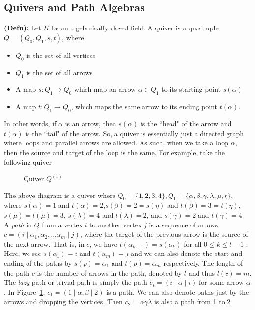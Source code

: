 \documentclass{report}
\theoremstyle{definition}
\numberwithin{figure}{section}
\begin{document}
\subsection{Quivers and Path Algebras}
\textbf{(Defn): }Let $K$ be an algebraically closed field. A quiver is a quadruple $Q=(Q_0,Q_1,s,t)$, where \begin{itemize}
    \item $Q_0$ is the set of all vertices 
    \item $Q_1$ is the set of all arrows
    \item A map $s:Q_1 \to Q_0$ which map an arrow $\alpha \in Q_1$ to its starting point $s(\alpha)$ 
    \item A map $t:Q_1 \to Q_0$, which maps the same arrow to its ending point $t(\alpha)$. 
\end{itemize}
In other words, if $\alpha$ is an arrow, then $s(\alpha)$ is the ``head" of the arrow and $t(\alpha)$ is the ``tail" of the arrow. So, a quiver is essentially just a directed graph where loops and parallel arrows are allowed. As such, when we take a loop $\alpha$, then the source and target of the loop is the same. For example, take the following quiver
\begin{figure}[H]
\centering
{}
\caption{Quiver $Q^{(1)}$}
\label{fig:quiverexample}
\end{figure}

 The above diagram is a quiver where $Q_0=\{1,2,3,4\},Q_1=\{\alpha,\beta,\gamma,\lambda,\mu,\eta\}$. where $s(\alpha)=1$ and $t(\alpha)=2$,$s(\beta)=2=s(\eta)$ and $t(\beta)=3=t(\eta)$, $s(\mu)=t(\mu)=3$, $s(\lambda)=4$ and $t(\lambda)=2$, and $s(\gamma)=2$ and $t(\gamma)=4$\\


 A \textit{path} in $Q$ from a vertex $i$ to another vertex $j$ is a sequence of arrows  $c=(i\mid\alpha_1,\alpha_2,...\alpha_m\mid j)$, where the target of the previous arrow is the source of the next arrow. That is, in $c$, we have $t(\alpha_{k-1})=s(\alpha_k)$ for all $0\leq k \leq t-1$ . Here, we see $s(\alpha_1)=i$ and $t(\alpha_{m})=j$ and we can also denote the start and ending of the paths by $s(p)=\alpha_1$ and $t(p)=\alpha_m$ respectively. The length of the path $c$ is the number of arrows in the path, denoted by $l$ and thus $l(c)=m$. The \textit{lazy} path or trivial path is simply the path $e_i=(i\mid \alpha \mid i)$ for some arrow $\alpha$. In Figure~\ref{fig:quiverexample}, $c_1=(1\mid \alpha,\beta\mid 2)$ is a path. We can also denote paths just by the arrows and dropping the vertices. Then $c_2=\alpha\gamma\lambda$ is also a path from 1 to 2\\
 
\end{document}
